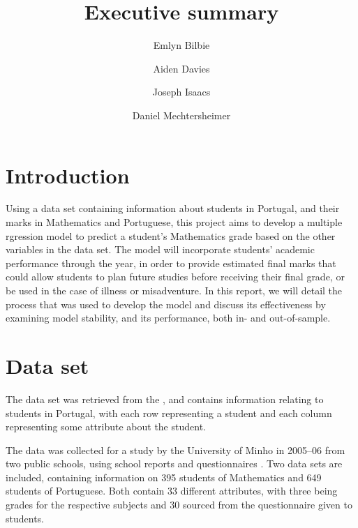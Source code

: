 \documentclass[a4paper,9pt,twocolumn,twoside,]{pinp}
\title{Executive summary}
\author[1]{Emlyn Bilbie}
\author[1]{Aiden Davies}
\author[1]{Joseph Isaacs}
\author[1]{Daniel Mechtersheimer}
\affil[1]{T09oc\_early\_4, DATA2902, University of Sydney}
\begin{document}
\verticaladjustment{-2pt}

\maketitle
\thispagestyle{firststyle}



\hypertarget{introduction}{%
\section{Introduction}\label{introduction}}

Using a data set containing information about students in Portugal, and
their marks in Mathematics and Portuguese, this project aims to develop
a multiple rgression model to predict a student's Mathematics grade
based on the other variables in the data set. The model will incorporate
students' academic performance through the year, in order to provide
estimated final marks that could allow students to plan future studies
before receiving their final grade, or be used in the case of illness or
misadventure. In this report, we will detail the process that was used
to develop the model and discuss its effectiveness by examining model
stability, and its performance, both in- and out-of-sample.

\hypertarget{data-set}{%
\section{Data set}\label{data-set}}

The data set was retrieved from the \cite{uci}, and contains information
relating to students in Portugal, with each row representing a student
and each column representing some attribute about the student.

The data was collected for a study by the University of Minho in
2005--06 from two public schools, using school reports and
questionnaires \citep*{cortezsilva08}. Two data sets are included,
containing information on 395 students of Mathematics and 649 students
of Portuguese. Both contain 33 different attributes, with three being
grades for the respective subjects and 30 sourced from the questionnaire
given to students.
\end{document}
